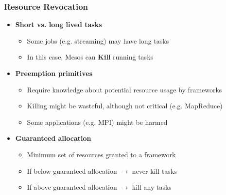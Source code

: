 \begin{frame}
\frametitle{Resource Revocation}
\begin{itemize}
	\item {\bf Short vs. long lived tasks}
	\begin{itemize}
		\item Some jobs (e.g. streaming) may have long tasks
		\item In this case, Mesos can {\bf Kill} running tasks
	\end{itemize}

\vspace{20pt}

	\item {\bf Preemption primitives}
	\begin{itemize}
		\item Require knowledge about potential resource usage by frameworks
		\item Killing might be wasteful, although not critical (e.g. MapReduce)
		\item Some applications (e.g. MPI) might be harmed
	\end{itemize}

\vspace{20pt}

	\item {\bf Guaranteed allocation}
	\begin{itemize}
		\item Minimum set of resources granted to a framework
		\item If below guaranteed allocation $\to$ never kill tasks
		\item If above guaranteed allocation $\to$ kill any tasks
	\end{itemize}
\end{itemize}
\end{frame}

